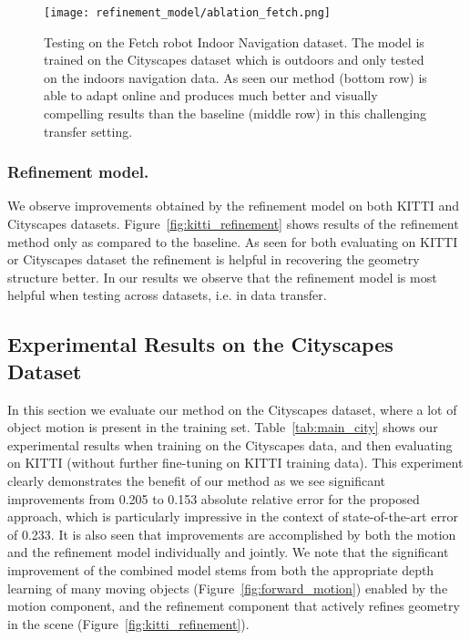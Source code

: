 \documentclass[letterpaper]{article} \usepackage{aaai19}  \usepackage{times}  \usepackage{helvet}  \usepackage{courier}  \usepackage{url}  \usepackage{graphicx}  \frenchspacing
\begin{document}
\begin{figure*}
    \centering   \texttt{[image: refinement\_model/ablation\_fetch.png]}
    \caption{Testing on the Fetch robot Indoor Navigation dataset. The model is trained on the Cityscapes dataset which is outdoors and only tested on the indoors navigation data. As seen our method (bottom row) is able to adapt online and produces much better and visually compelling results than the baseline (middle row) in this challenging transfer setting.}
    \label{fig:fetch}
\end{figure*}

\subsubsection{Refinement model.}
We observe improvements obtained by the refinement model on both KITTI and Cityscapes datasets.
Figure~\ref{fig:kitti_refinement} shows results of the refinement method only as compared to the baseline.
As seen for both evaluating on KITTI or Cityscapes dataset the refinement is helpful in recovering the geometry structure better.
In our results we observe that the refinement model is most helpful when testing across datasets, i.e. in data transfer.

\subsection{Experimental Results on the Cityscapes Dataset}

In this section we evaluate our method on the Cityscapes dataset, where a lot of object motion is present in the training set. Table~\ref{tab:main_city} shows our experimental results when training on the Cityscapes data, and then evaluating on KITTI (without further fine-tuning on KITTI training data).
This experiment clearly demonstrates the benefit of our method as we see significant improvements from 0.205 to 0.153 absolute relative error for the proposed approach, which is particularly impressive in the context of state-of-the-art error of 0.233. It is also seen that improvements are accomplished by both the motion and the refinement model individually and jointly. We note that the significant improvement of the combined model stems from both the appropriate depth learning of many moving objects (Figure~\ref{fig:forward_motion}) enabled by the motion component, and the refinement component that actively refines geometry in the scene (Figure~\ref{fig:kitti_refinement}).
\end{document}
